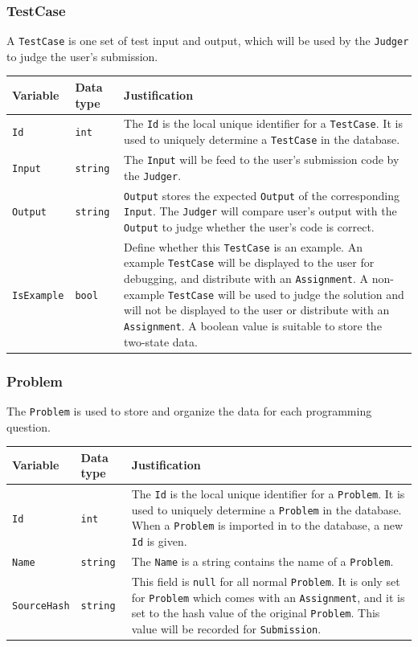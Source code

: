 \documentclass[a4paper]{report}
\begin{document}
\subsubsection{TestCase}

A \verb|TestCase| is one set of test input and output, which will be used by the \verb|Judger| to judge the user's submission.

\begin{tabulary}{\textwidth}{|l|l|L|}
    \hline
    Variable & Data type & Justification \\
    \hline
    \verb|Id| & \verb|int| & The \verb|Id| is the local unique identifier for a \verb|TestCase|. It is used to uniquely determine a \verb|TestCase| in the database. \\
    \hline
    \verb|Input| & \verb|string| & The \verb|Input| will be feed to the user's submission code by the \verb|Judger|. \\
    \hline
    \verb|Output| & \verb|string| & \verb|Output| stores the expected \verb|Output| of the corresponding \verb|Input|. The \verb|Judger| will compare user's output with the \verb|Output| to judge whether the user's code is correct. \\
    \hline
    \verb|IsExample| & \verb|bool| & Define whether this \verb|TestCase| is an example. An example \verb|TestCase| will be displayed to the user for debugging, and distribute with an \verb|Assignment|. A non-example \verb|TestCase| will be used to judge the solution and will not be displayed to the user or distribute with an \verb|Assignment|. A boolean value is suitable to store the two-state data. \\
    \hline
\end{tabulary}

\subsubsection{Problem}

The \verb|Problem| is used to store and organize the data for each programming question.

\begin{tabulary}{\textwidth}{|l|l|L|}
    \hline
    Variable & Data type & Justification \\
    \hline
    \verb|Id| & \verb|int| & The \verb|Id| is the local unique identifier for a \verb|Problem|. It is used to uniquely determine a \verb|Problem| in the database. When a \verb|Problem| is imported in to the database, a new \verb|Id| is given. \\
    \hline
    \verb|Name| & \verb|string| & The \verb|Name| is a string contains the name of a \verb|Problem|. \\
    \hline
    \verb|SourceHash| & \verb|string| & This field is \verb|null| for all normal \verb|Problem|. It is only set for \verb|Problem| which comes with an \verb|Assignment|, and it is set to the hash value of the original \verb|Problem|. This value will be recorded for \verb|Submission|. \\
    \hline
\end{tabulary}
\end{document}
